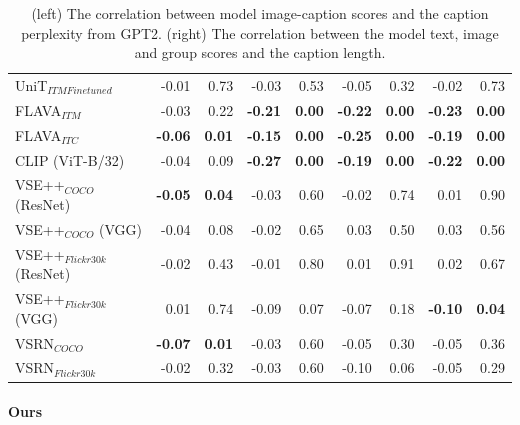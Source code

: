 \begin{table}[ht]
\begin{adjustbox}{max width=\textwidth}
\begin{tabular}{l|rr|rrrrrr}
 UniT$_{ITM Finetuned}$       & -0.01          & 0.73          & -0.03          & 0.53          & -0.05          & 0.32          & -0.02          & 0.73          \\
 FLAVA$_{ITM}$                & -0.03          & 0.22          & \textbf{-0.21} & \textbf{0.00} & \textbf{-0.22} & \textbf{0.00} & \textbf{-0.23} & \textbf{0.00} \\
 FLAVA$_{ITC}$        & \textbf{-0.06} & \textbf{0.01} & \textbf{-0.15} & \textbf{0.00} & \textbf{-0.25} & \textbf{0.00} & \textbf{-0.19} & \textbf{0.00} \\
 CLIP (ViT-B/32)              & -0.04          & 0.09          & \textbf{-0.27} & \textbf{0.00} & \textbf{-0.19} & \textbf{0.00} & \textbf{-0.22} & \textbf{0.00} \\
 VSE++$_{COCO}$ (ResNet)      & \textbf{-0.05} & \textbf{0.04} & -0.03          & 0.60          & -0.02          & 0.74          & 0.01           & 0.90          \\
 VSE++$_{COCO}$ (VGG)         & -0.04          & 0.08          & -0.02          & 0.65          & 0.03           & 0.50          & 0.03           & 0.56          \\
 VSE++$_{Flickr30k}$ (ResNet) & -0.02          & 0.43          & -0.01          & 0.80          & 0.01           & 0.91          & 0.02           & 0.67          \\
 VSE++$_{Flickr30k}$ (VGG)    & 0.01           & 0.74          & -0.09          & 0.07          & -0.07          & 0.18          & \textbf{-0.10} & \textbf{0.04} \\
 VSRN$_{COCO}$                & \textbf{-0.07} & \textbf{0.01} & -0.03          & 0.60          & -0.05          & 0.30          & -0.05          & 0.36          \\
 VSRN$_{Flickr30k}$           & -0.02          & 0.32          & -0.03          & 0.60          & -0.10          & 0.06          & -0.05          & 0.29          \\
\bottomrule
\end{tabular}
\end{adjustbox}
\caption{(left) The correlation between model image-caption scores and the caption perplexity from GPT2. (right) The correlation between the model text, image and group scores and the caption length.}
\label{tab:perplexity-and-length-correlations-baseline}
\end{table}

\paragraph{Ours}

